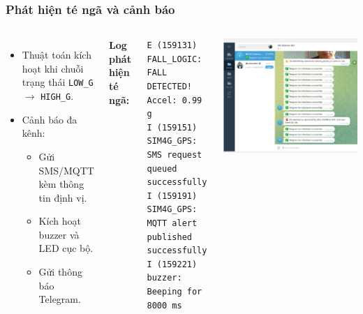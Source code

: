 \begin{frame}[t,fragile]
\frametitle{Phát hiện té ngã và cảnh báo}
\begin{columns}[T]
    \begin{itemize}
        \item Thuật toán kích hoạt khi chuỗi trạng thái \texttt{LOW\_G} $\to$ \texttt{HIGH\_G}.
        \item Cảnh báo đa kênh:
        \begin{itemize}
            \item Gửi SMS/MQTT kèm thông tin định vị.
            \item Kích hoạt buzzer và LED cục bộ.
            \item Gửi thông báo Telegram.
        \end{itemize}
    \end{itemize}
    \vspace{0.2cm}
    \textbf{Log phát hiện té ngã:}
    \begin{verbatim}
E (159131) FALL_LOGIC: FALL DETECTED! Accel: 0.99 g
I (159151) SIM4G_GPS: SMS request queued successfully
I (159191) SIM4G_GPS: MQTT alert published successfully.
I (159221) buzzer: Beeping for 8000 ms
    \end{verbatim}

    \centering
    \includegraphics[width=0.9\linewidth]{images/telegram_fall_module1_send.png}
\end{columns}
\end{frame}

